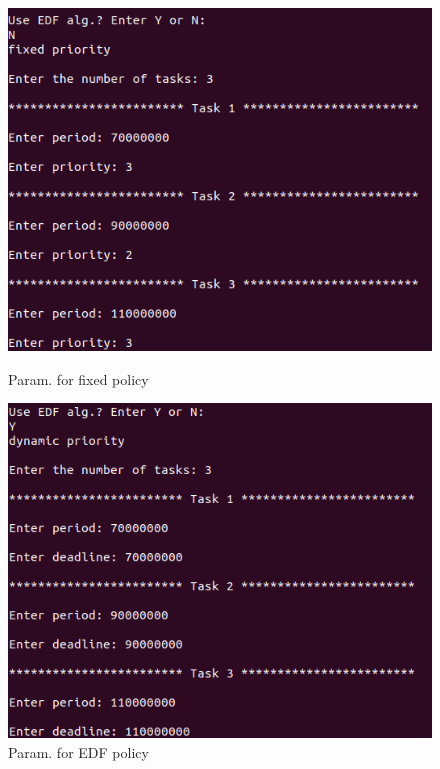 \documentclass[12pt,hidelinks]{article}
\begin{document}
{         \begin{figure}[ht]
            \centering
            \begin{minipage}{0.4\textwidth}
                \centering
                \includegraphics[width=1.25\textwidth]{paramFixed.png} %
                \caption{Param. for fixed policy}
            \end{minipage}\hfill
            \begin{minipage}{0.4\textwidth}
                \centering
                \includegraphics[width=1.3\textwidth]{paramDynamic.png} %
                \caption{Param. for EDF policy}
            \end{minipage}
        \end{figure} \newline
        
}
\end{document}
